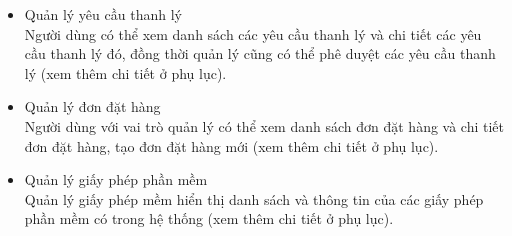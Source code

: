 \begin{itemize}
\item{Quản lý yêu cầu thanh lý}\\
Người dùng có thể xem danh sách các yêu cầu thanh lý và chi tiết các yêu cầu thanh lý đó, đồng thời quản lý cũng có thể phê duyệt các yêu cầu thanh lý (xem thêm chi tiết ở phụ lục).

\item{Quản lý đơn đặt hàng}\\
Người dùng với vai trò quản lý có thể xem danh sách đơn đặt hàng và chi tiết đơn đặt hàng, tạo đơn đặt hàng mới (xem thêm chi tiết ở phụ lục).

\item{Quản lý giấy phép phần mềm}\\
Quản lý giấy phép mềm hiển thị danh sách và thông tin của các giấy phép phần mềm có trong hệ thống (xem thêm chi tiết ở phụ lục).


\end{itemize}

